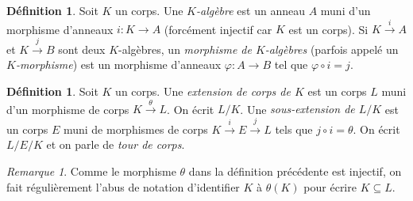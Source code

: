 \documentclass{article}
\theoremstyle{plain}
\theoremstyle{definition}
\newtheorem{definition}[theorem]{Définition}
\theoremstyle{remark}
\newtheorem*{remark}{Remarque}
\begin{document}
\begin{definition}
    Soit $K$ un corps. Une \emph{$K$-algèbre} est un anneau $A$ muni d'un morphisme d'anneaux $i : K \to A$ (forcément injectif car $K$ est un corps). Si $K \xrightarrow{i} A$ et $K \xrightarrow{j} B$ sont deux $K$-algèbres, un \emph{morphisme de $K$-algèbres} (parfois appelé un \emph{$K$-morphisme}) est un morphisme d'anneaux $\varphi : A \to B$ tel que $\varphi \circ i = j$.
\end{definition}

\begin{definition}
    Soit $K$ un corps. Une \emph{extension de corps de $K$} est un corps $L$ muni d'un morphisme de corps $K \xrightarrow{\theta} L$. On écrit $L/K$. Une \emph{sous-extension de $L/K$} est un corps $E$ muni de morphismes de corps $K \xrightarrow{i} E \xrightarrow{j} L$ tels que $j \circ i = \theta$. On écrit $L/E/K$ et on parle de \emph{tour de corps}.
\end{definition}

\begin{remark}
    Comme le morphisme $\theta$ dans la définition précédente est injectif, on fait régulièrement l'abus de notation d'identifier $K$ à $\theta(K)$ pour écrire $K \subseteq L$.
\end{remark}
\end{document}
